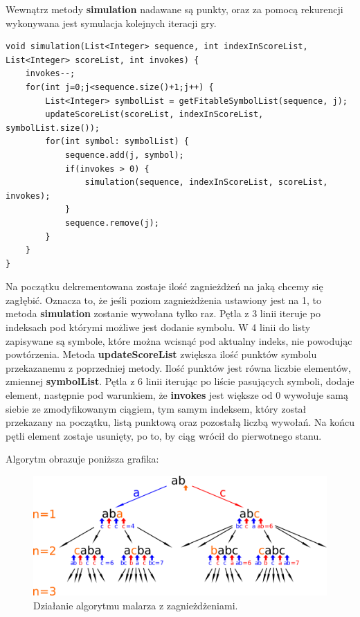 \documentclass[document]{xmgr}
\begin{document}
Wewnątrz metody \textbf{simulation} nadawane są punkty, oraz za pomocą rekurencji wykonywana jest symulacja kolejnych iteracji gry.

\begin{lstlisting}[frame=single]
void simulation(List<Integer> sequence, int indexInScoreList, List<Integer> scoreList, int invokes) {
	invokes--;
	for(int j=0;j<sequence.size()+1;j++) {
		List<Integer> symbolList = getFitableSymbolList(sequence, j);
		updateScoreList(scoreList, indexInScoreList, symbolList.size());
		for(int symbol: symbolList) {
			sequence.add(j, symbol);
			if(invokes > 0) {
				simulation(sequence, indexInScoreList, scoreList, invokes);
			}
			sequence.remove(j);
		}
	}
}
\end{lstlisting}

Na początku dekrementowana zostaje ilość zagnieżdżeń na jaką chcemy się zagłębić. Oznacza to, że jeśli poziom zagnieżdżenia ustawiony jest na 1, to metoda \textbf{simulation} zostanie wywołana tylko raz. Pętla z 3 linii iteruje po indeksach pod którymi możliwe jest dodanie symbolu. W 4 linii do listy zapisywane są symbole, które można wcisnąć pod aktualny indeks, nie powodując powtórzenia. Metoda \textbf{updateScoreList} zwiększa ilość punktów symbolu przekazanemu z poprzedniej metody. Ilość punktów jest równa liczbie elementów, zmiennej \textbf{symbolList}. Pętla z 6 linii iterując po liście pasujących symboli, dodaje element, następnie pod warunkiem, że \textbf{invokes} jest większe od 0 wywołuje samą siebie ze zmodyfikowanym ciągiem, tym samym indeksem, który został przekazany na początku, listą punktową oraz pozostałą liczbą wywołań. Na końcu pętli element zostaje usunięty, po to, by ciąg wrócił do pierwotnego stanu.

Algorytm obrazuje poniższa grafika:


\begin{figure}[H]
    \centering
    \includegraphics[scale = 0.08]{images/nestingPainter}
    \caption{Działanie algorytmu malarza z zagnieżdżeniami.}
    \label{fig:nestingPainter}
\end{figure}
\end{document}
